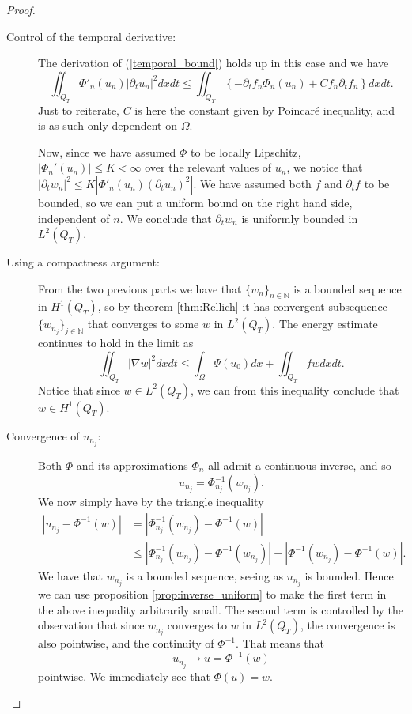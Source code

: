 \documentclass[11pt, a4paper]{article}
\begin{document}
\begin{proof}
\begin{description}
	\item[Control of the temporal derivative:] The derivation of (\ref{temporal_bound}) holds up in this case and we have
	\begin{equation*}
	\label{exist_proof_temporal}
	\iint_{Q_T} \Phi'_n(u_n)|\partial_t u_n|^2 dxdt \leq \iint_{Q_T} \left\{ -\partial_t f_n \Phi_n(u_n) + Cf_n\partial_tf_n \right\} dxdt.
	\end{equation*}
	Just to reiterate, $C$ is here the constant given by Poincaré inequality, and is as such only dependent on $\Omega$. 
	
	Now, since we have assumed $\Phi$ to be locally Lipschitz, $|\Phi_n'(u_n)| \leq K < \infty$ over the relevant values of $u_n$, we notice that $|\partial_t w_n|^2 \leq K|\Phi'_n(u_n) (\partial_t u_n)^2|$. We have assumed both $f$ and $\partial_t f$ to be bounded, so we can put a uniform bound on the right hand side, independent of $n$. We conclude that $\partial_t w_n$ is uniformly bounded in $L^2(Q_T)$.
	
	\item[Using a compactness argument:]From the two previous parts we have that $\{w_n\}_{n \in \mathbb{N}}$ is a bounded sequence in $H^1(Q_T)$, so by theorem \ref{thm:Rellich} it has convergent subsequence $\{w_{n_j}\}_{j \in \mathbb{N}}$ that converges to some $w$ in $L^2(Q_T)$. The energy estimate continues to hold in the limit as
	\begin{equation}
	\iint_{Q_T}|\nabla w|^2 dxdt \leq \int_\Omega \Psi(u_0)dx + \iint_{Q_T}fw dxdt.
	\end{equation}
	Notice that since $w \in L^2(Q_T)$, we can from this inequality conclude that $w \in H^1(Q_T)$.
	
	\item[Convergence of $u_{n_j}$:] Both $\Phi$ and its approximations $\Phi_n$ all admit a continuous inverse, and so
	\begin{equation*}
	u_{n_j} = \Phi_{n_j}^{-1}(w_{n_j}).
	\end{equation*}
	We now simply have by the triangle inequality
	\begin{align*}
	|u_{n_j} - \Phi^{-1}(w)| &= |\Phi_{n_j}^{-1}(w_{n_j}) - \Phi^{-1}(w)| \\
		&\leq |\Phi_{n_j}^{-1}(w_{n_j}) - \Phi^{-1}(w_{n_j})| + |\Phi^{-1}(w_{n_j}) - \Phi^{-1}(w)|.
	\end{align*}
	 We have that $w_{n_j}$ is a bounded sequence, seeing as $u_{n_j}$ is bounded. Hence we can use proposition \ref{prop:inverse_uniform} to make the first term in the above inequality arbitrarily small. The second term is controlled by the observation that since $w_{n_j}$ converges to $w$ in $L^2(Q_T)$, the convergence is also pointwise, and the continuity of $\Phi^{-1}$. That means that
	 \begin{equation*}
	 u_{n_j} \to u = \Phi^{-1}(w)
	 \end{equation*}
	 pointwise. We immediately see that $\Phi(u) = w$.
	 

\end{description}
\end{proof}
\end{document}
